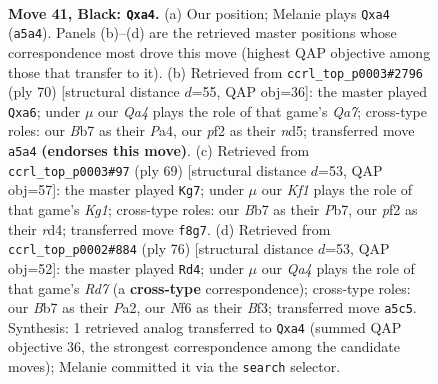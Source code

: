 \documentclass[11pt]{article}
\begin{document}
\clearpage

\begin{figure}[p]\centering
\begin{subfigure}{0.46\textwidth}\centering
\resizebox{\linewidth}{!}{%
\newchessgame
\chessboard[
  setfen={5k2/1b3p2/5np1/q6p/P7/6P1/1p2RP1P/1R3NK1 b - - 3 41},
  showmover=false,
  pgfstyle=straightmove, color=movearrow, markmove={a5-a4}
]}
\caption{}
\end{subfigure}\hfill
\begin{subfigure}{0.46\textwidth}\centering
\resizebox{\linewidth}{!}{%
\newchessgame
\chessboard[
  setfen={3r4/Q1p2ppk/p6p/3n4/P6P/1r3PN1/6PK/8 w - - 0 36},
  showmover=false,
  pgfstyle=straightmove, color=movearrow, markmove={a7-a6}
]}
\caption{}
\end{subfigure}
\\[4pt]
\begin{subfigure}{0.46\textwidth}\centering
\resizebox{\linewidth}{!}{%
\newchessgame
\chessboard[
  setfen={6k1/1p3p2/8/1p5p/3RP1p1/1R4P1/4qPKP/8 b - - 1 35},
  showmover=false,
  pgfstyle=straightmove, color=movearrow, markmove={g8-g7}
]}
\caption{}
\end{subfigure}\hfill
\begin{subfigure}{0.46\textwidth}\centering
\resizebox{\linewidth}{!}{%
\newchessgame
\chessboard[
  setfen={8/3R1p2/5kn1/p1r3p1/2P2p2/5B1P/P1K3P1/8 w - - 5 39},
  showmover=false,
  pgfstyle=straightmove, color=movearrow, markmove={d7-d4}
]}
\caption{}
\end{subfigure}
\caption{\textbf{Move 41, Black: \texttt{Qxa4}.} (a) Our position; Melanie plays \texttt{Qxa4} (\texttt{a5a4}). Panels (b)--(d) are the retrieved master positions whose correspondence most drove this move (highest QAP objective among those that transfer to it). (b) Retrieved from \texttt{ccrl\_top\_p0003\#2796} (ply 70) [structural distance $d$=55, QAP obj=36]: the master played \texttt{Qxa6}; under $\mu$ our \emph{Qa4} plays the role of that game's \emph{Qa7}; cross-type roles: our \emph{B}b7 as their \emph{P}a4, our \emph{p}f2 as their \emph{n}d5; transferred move \texttt{a5a4} \textbf{(endorses this move)}. (c) Retrieved from \texttt{ccrl\_top\_p0003\#97} (ply 69) [structural distance $d$=53, QAP obj=57]: the master played \texttt{Kg7}; under $\mu$ our \emph{Kf1} plays the role of that game's \emph{Kg1}; cross-type roles: our \emph{B}b7 as their \emph{P}b7, our \emph{p}f2 as their \emph{r}d4; transferred move \texttt{f8g7}. (d) Retrieved from \texttt{ccrl\_top\_p0002\#884} (ply 76) [structural distance $d$=53, QAP obj=52]: the master played \texttt{Rd4}; under $\mu$ our \emph{Qa4} plays the role of that game's \emph{Rd7} (a \textbf{cross-type} correspondence); cross-type roles: our \emph{B}b7 as their \emph{P}a2, our \emph{N}f6 as their \emph{B}f3; transferred move \texttt{a5c5}. Synthesis: 1 retrieved analog transferred to \texttt{Qxa4} (summed QAP objective 36, the strongest correspondence among the candidate moves); Melanie committed it via the \texttt{search} selector.}
\label{fig:thought-m81}
\end{figure}
\end{document}

